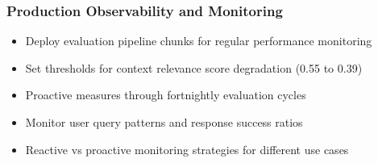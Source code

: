 \begin{frame}[fragile]\frametitle{Production Observability and Monitoring}
      \begin{itemize}
	\item Deploy evaluation pipeline chunks for regular performance monitoring
	\item Set thresholds for context relevance score degradation (0.55 to 0.39)
	\item Proactive measures through fortnightly evaluation cycles
	\item Monitor user query patterns and response success ratios
	\item Reactive vs proactive monitoring strategies for different use cases
	  \end{itemize}
\end{frame}
